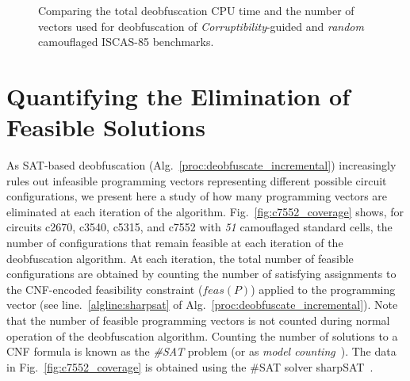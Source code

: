 \documentclass[proposal]{umassthesis}  %
\begin{document}


    \begin{figure}[!ht]
  \centering
    \hspace{20pt}
    \caption{Comparing the total deobfuscation CPU time and the number of vectors used for deobfuscation of \textit{Corruptibility}-guided and \textit{random} camouflaged ISCAS-85 benchmarks.}
    \vspace{-2mm}
    \label{fig:comparison_corrupt_random}
  \end{figure}


\section{Quantifying the Elimination of Feasible Solutions}
As SAT-based deobfuscation (Alg.~\ref{proc:deobfuscate_incremental}) increasingly rules out infeasible programming vectors representing different possible circuit configurations, we present here a study of how many programming vectors are eliminated at each iteration of the algorithm. Fig.~\ref{fig:c7552_coverage} shows, for circuits c2670, c3540, c5315, and c7552 with \textit{51} camouflaged standard cells, the number of configurations that remain feasible at each iteration of the deobfuscation algorithm. At each iteration, the total number of feasible configurations are obtained by counting the number of satisfying assignments to the CNF-encoded feasibility constraint ($feas(P)$) applied to the programming vector (see line.~\ref{algline:sharpsat} of Alg.~\ref{proc:deobfuscate_incremental}). Note that the number of feasible programming vectors is not counted during normal operation of the deobfuscation algorithm. Counting the number of solutions to a CNF formula is known as the \textit{\#SAT} problem (or as \textit{model counting}~\cite{birnbaum1999good}). The data in Fig.~\ref{fig:c7552_coverage} is obtained using the \#SAT solver sharpSAT~\cite{thurley2006sharpsat}.
\end{document}
